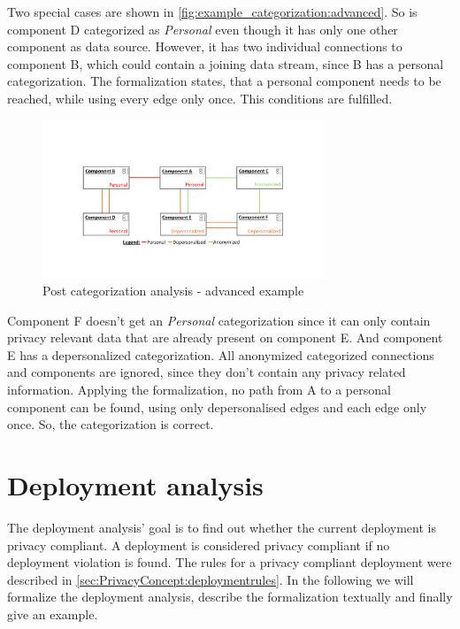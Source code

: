 Two special cases are shown in \autoref{fig:example_categorization:advanced}. So is component D categorized as \textit{Personal} even though it has only one other component as data source. However, it has two individual connections to component B, which could contain a joining data stream, since B has a personal categorization. The formalization states, that a personal component needs to be reached, while using every edge only once. This conditions are fulfilled.

\begin{figure}[H]
	\centering
	\includegraphics[trim = 35mm 40mm 40mm 45mm, clip, width=0.75\textwidth]{graphs/component_categorization_examples_upcast_advanced}
	\caption{Post categorization analysis - advanced example}
	\label{fig:example_categorization:advanced}
\end{figure}

Component F doesn't get an \textit{Personal} categorization since it can only contain privacy relevant data that are already present on component E. And component E has a depersonalized categorization. All anonymized categorized connections and components are ignored, since they don't contain any privacy related information. Applying the formalization, no path from A to a personal component can be found, using only depersonalised edges and each edge only once. So, the categorization is correct.


\section{Deployment analysis}
\label{sec:PrivacyAnalysis:deployment}

The deployment analysis' goal is to find out whether the current deployment is privacy compliant. A deployment is considered privacy compliant if no deployment violation is found. The rules for a privacy compliant deployment were described in \autoref{sec:PrivacyConcept:deploymentrules}. In the following we will formalize the deployment analysis, describe the formalization textually and finally give an example.


